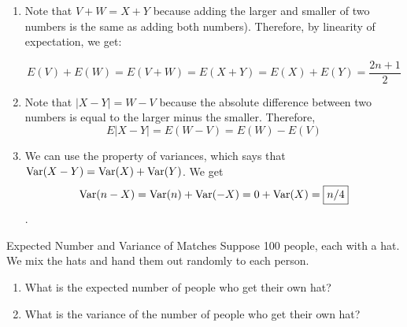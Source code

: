 \documentclass[11pt]{article}
\begin{document}
\begin{solution}{3}
\vspace{-5mm}
\begin{enumerate}
\item Note that $V + W = X + Y$ because adding the larger and smaller of two numbers is the same as adding both numbers). Therefore, by linearity of expectation, we get: 

$$ E(V) + E(W) = E(V+ W) = E(X + Y) = E(X) + E(Y) = \boxed{\frac{2n+1}{2}}$$ 

\item Note that $|X - Y| = W - V$ because the absolute difference between two numbers is equal to the larger minus the smaller. Therefore, $$ E|X - Y| = E(W - V) = E(W) - E(V)$$

\item We can use the property of variances, which says that $\textrm{Var}(X - Y) = \textrm{Var}(X) + \textrm{Var}(Y)$. We get $$\textrm{Var}(n - X) = \textrm{Var}(n) + \textrm{Var}(-X) = 0 + \textrm{Var}(X) = \boxed{n/4}$$. 
\end{enumerate}
\end{solution}

\begin{exercise}{Expected Number and Variance of Matches}
Suppose 100 people, each with a hat. We mix the hats and hand them out randomly to each person.
\begin{enumerate}
\item What is the expected number of people who get their own hat?
\item What is the variance of the number of people who get their own hat?
\end{enumerate}
\end{exercise}
\end{document}
